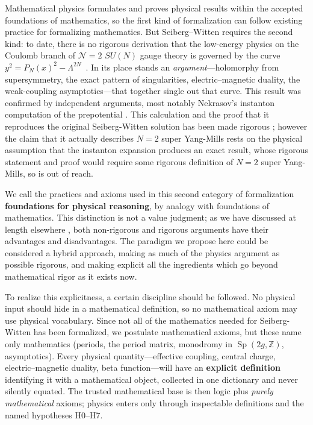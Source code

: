 \documentclass{article}
\theoremstyle{plain}
\theoremstyle{definition}
\numberwithin{equation}{section}
\newcommand{\Z}{\mathbb{Z}}
\newcommand{\Sp}{\operatorname{Sp}}
\begin{document}
Mathematical physics formulates and proves physical results within the accepted foundations of mathematics,
so the first kind of formalization can follow existing practice for formalizing mathematics.
But Seiberg--Witten requires the second kind: to date, there is no rigorous derivation that the low-energy
physics on the Coulomb branch of $\mathcal{N}=2$ $SU(N)$ gauge theory is governed by the curve
$y^2 = P_N(x)^2 - \Lambda^{2N}$~\cite{KLYT1995,ArgyresFaraggi1995}. In its place stands an \emph{argument}---holomorphy from
supersymmetry, the exact pattern of singularities, electric--magnetic duality, the weak-coupling
asymptotics---that together single out that curve.  This result was confirmed by independent arguments, most notably
Nekrasov's instanton computation of the prepotential \cite{Nekrasov2003}.  This calculation and
the proof that it reproduces the original Seiberg-Witten solution has been made rigorous
\cite{NekrasovOkounkov2006,NakajimaYoshioka2005,BravermanEtingof2006}; however the claim that it actually
describes $N=2$  super Yang-Mills rests on the physical assumption that the instanton expansion produces an exact result,
whose rigorous statement and proof would require some rigorous definition of $N=2$  super Yang-Mills,
so is out of reach.

We call the practices and axioms used in this second category of formalization
\textbf{foundations for physical reasoning}, by analogy with
foundations of mathematics.
This distinction is not a value judgment; as we have discussed at length elsewhere \cite{douglas2011foundations}, both
non-rigorous and rigorous arguments have their advantages and disadvantages.  The paradigm we propose here could be considered
a hybrid approach, making as much of the physics argument as possible rigorous, and making explicit all the ingredients which go beyond
mathematical rigor as it exists now.

To realize this explicitness, a certain discipline should be followed.  No physical input should hide in a mathematical definition,
so {no mathematical axiom may use physical vocabulary}. Since not all of the mathematics needed for Seiberg-Witten has been formalized,
we postulate mathematical axioms, but these name only mathematics
(periods, the period matrix, monodromy in $\Sp(2g,\Z)$, asymptotics).
Every physical quantity---effective coupling, central charge, electric--magnetic duality, beta function---will have an
\textbf{explicit definition} identifying it with a mathematical object, collected in one dictionary
and never silently equated. The trusted mathematical base is then logic plus \emph{purely mathematical} axioms;
physics enters only through inspectable definitions and the named hypotheses H0--H7. 
\end{document}
